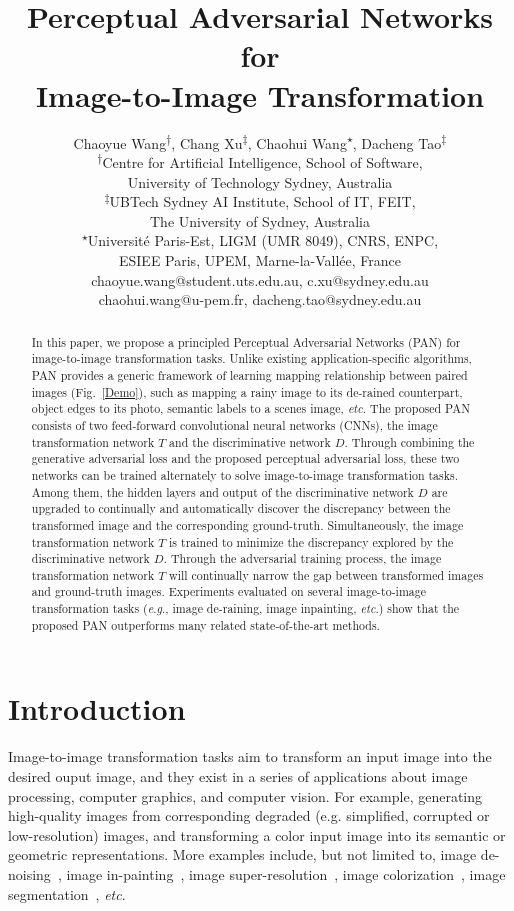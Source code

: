 \documentclass{article}
\date{}
\title{Perceptual Adversarial Networks for \\ Image-to-Image Transformation}
\author{Chaoyue Wang\textsuperscript{$\dagger$}, Chang Xu\textsuperscript{$\ddagger$}, Chaohui Wang\textsuperscript{$\star$}, Dacheng Tao\textsuperscript{$\ddagger$}\\
\textsuperscript{$\dagger$}Centre for Artificial Intelligence, School of Software, \\
University of Technology Sydney, Australia\\
\textsuperscript{$\ddagger$}UBTech Sydney AI Institute, School of IT, FEIT, \\
The University of Sydney, Australia
\\
\textsuperscript{$\star$}Universit\'{e} Paris-Est, LIGM (UMR 8049), CNRS, ENPC,\\
 ESIEE Paris, UPEM, Marne-la-Vall\'{e}e, France\\
chaoyue.wang@student.uts.edu.au, c.xu@sydney.edu.au\\
 chaohui.wang@u-pem.fr, dacheng.tao@sydney.edu.au
}
\newcommand{\eg}{\textit{e}.\textit{g}.}
\newcommand{\etc}{\textit{etc}}
\begin{document}
\maketitle

\begin{abstract}
In this paper, we propose a principled Perceptual Adversarial Networks (PAN) for image-to-image transformation tasks. Unlike existing application-specific algorithms, PAN provides a generic framework of learning mapping relationship between paired images (Fig.~\ref{Demo}), such as mapping a rainy image to its de-rained counterpart, object edges to its photo, semantic labels to a scenes image, \etc. The proposed PAN consists of two feed-forward convolutional neural networks (CNNs), the image transformation network $T$ and the discriminative network $D$. Through combining the generative adversarial loss and the proposed perceptual adversarial loss, these two networks can be trained alternately to solve image-to-image transformation tasks. Among them, the hidden layers and output of the discriminative network $D$ are upgraded to continually and automatically discover the discrepancy between the transformed image and the corresponding ground-truth. Simultaneously, the image transformation network $T$ is trained to minimize the discrepancy explored by the discriminative network $D$. Through the adversarial training process, the image transformation network $T$ will continually narrow the gap between transformed images and ground-truth images. Experiments evaluated on several image-to-image transformation tasks (\eg, image de-raining, image inpainting, \etc.) show that the proposed PAN outperforms many related state-of-the-art methods. 
\end{abstract}

\section{Introduction}
\label{sec:introduction}
Image-to-image transformation tasks aim to transform an input image into the desired ouput image, and they exist in a series of applications about image processing, computer graphics, and computer vision. For example, generating high-quality images from corresponding degraded (e.g. simplified, corrupted or low-resolution) images, and transforming a color input image into its semantic or geometric representations. More examples include, but not limited to, image de-noising~\cite{elad2006image}, image in-painting~\cite{bertalmio2000image}, image super-resolution~\cite{nasrollahi2014super}, image colorization~\cite{luan2007natural}, image segmentation~\cite{khan2014survey}, \etc.
\end{document}

